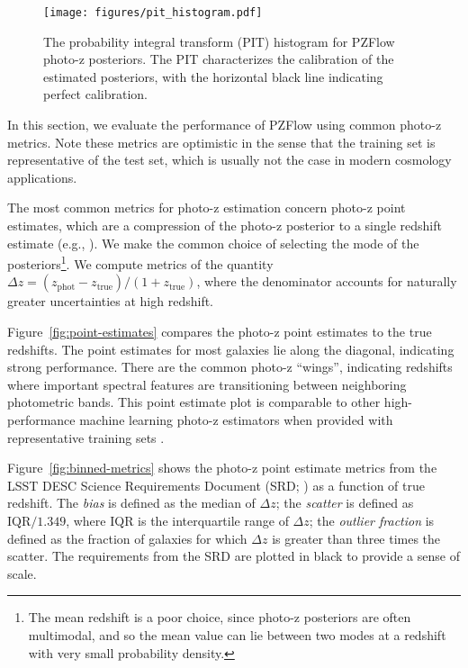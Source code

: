 \documentclass[twocolumn,twocolappendix]{aastex631}
\begin{document}
\begin{figure}[t]
    \begin{centering}
        \texttt{[image: figures/pit\_histogram.pdf]}
        \caption{
            The probability integral transform (PIT) histogram for PZFlow photo-z posteriors.
            The PIT characterizes the calibration of the estimated posteriors, with the horizontal black line indicating perfect calibration.
        }
        \label{fig:pit-histogram}
    \end{centering}
\end{figure}

In this section, we evaluate the performance of PZFlow using common photo-z metrics.
Note these metrics are optimistic in the sense that the training set is representative of the test set, which is usually not the case in modern cosmology applications.

The most common metrics for photo-z estimation concern photo-z point estimates, which are a compression of the photo-z posterior to a single redshift estimate (e.g., \citealt{hildebrandt2010,sanchez2014}).
We make the common choice of selecting the mode of the posteriors\footnote{The mean redshift is a poor choice, since photo-z posteriors are often multimodal, and so the mean value can lie between two modes at a redshift with very small probability density.}.
We compute metrics of the quantity $\Delta z = (z_\text{phot} - z_\text{true}) / (1 + z_\text{true})$, where the denominator accounts for naturally greater uncertainties at high redshift.

Figure~\ref{fig:point-estimates} compares the photo-z point estimates to the true redshifts.
The point estimates for most galaxies lie along the diagonal, indicating strong performance.
There are the common photo-z ``wings'', indicating redshifts where important spectral features are transitioning between neighboring photometric bands.
This point estimate plot is comparable to other high-performance machine learning photo-z estimators when provided with representative training sets \citep{sanchez2014}.

Figure~\ref{fig:binned-metrics} shows the photo-z point estimate metrics from the LSST DESC Science Requirements Document (SRD; \citealt{descSRD}) as a function of true redshift.
The \emph{bias} is defined as the median of $\Delta z$; the \emph{scatter} is defined as $\text{IQR} / 1.349$, where IQR is the interquartile range of $\Delta z$; the \emph{outlier fraction} is defined as the fraction of galaxies for which $\Delta z$ is greater than three times the scatter.
The requirements from the SRD are plotted in black to provide a sense of scale.
\end{document}
